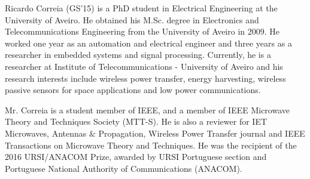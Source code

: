 \documentclass[journal]{IEEEtran}
\begin{document}
\begin{IEEEbiography}
{Ricardo Correia} (GS'15) is  a PhD student in Electrical Engineering at the University of Aveiro. He obtained his M.Sc. degree in Electronics and Telecommunications Engineering from the University of Aveiro in 2009. He worked one year as an automation and electrical engineer and three years as a researcher in embedded systems and signal processing.
Currently, he is a researcher at Institute of Telecommunications - University of Aveiro and his research interests include wireless power transfer, energy harvesting, wireless passive sensors for space applications and low power communications.

Mr. Correia is a student member of IEEE, and a member of IEEE Microwave Theory and Techniques Society (MTT-S). He is also a reviewer for IET Microwaves, Antennas \& Propagation, Wireless Power Transfer journal and IEEE Transactions on Microwave Theory and Techniques. He was the recipient of the 2016 URSI/ANACOM Prize, awarded by URSI Portuguese section and Portuguese National Authority of Communications (ANACOM).
\end{IEEEbiography}
\end{document}
